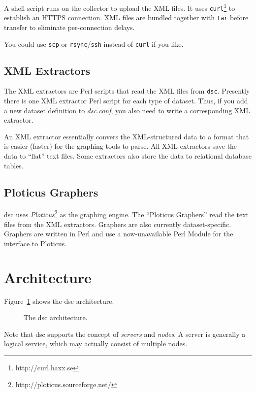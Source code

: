 \documentclass{report}
\def\dsc{{\sc dsc}}
\begin{document}
A shell script runs on the collector to upload the XML files.  It
uses {\tt curl\/}\footnote{http://curl.haxx.se} to establish an
HTTPS connection.  XML files are bundled together with {\tt tar\/}
before transfer to eliminate per-connection delays.

You could use {\tt scp\/} or {\tt rsync\/}/{\tt ssh\/} instead of
{\tt curl\/} if you like.

\subsection{XML Extractors}

The XML extractors are Perl scripts that read the XML files from
{\tt dsc\/}.  Presently there is one XML extractor Perl script for
each type of dataset.  Thus, if you add a new dataset definition
to {\em dsc.conf\/}, you also need to write a corresponding XML
extractor.

An XML extractor essentially convers the XML-structured data to a
format that is easier (faster) for the graphing tools to parse.
All XML extractors save the data to ``flat'' text files.  Some
extractors also store the data to relational database tables.

\subsection{Ploticus Graphers}

{\dsc} uses {\em Ploticus\/}\footnote{http://ploticus.sourceforge.net/}
as the graphing engine.  The ``Ploticus Graphers'' read the text
files from the XML extractors.  Graphers are also currently
dataset-specific.   Graphers are written in Perl and use a
now-unavailable Perl Module for the interface to Ploticus.


\section{Architecture}

Figure~\ref{fig-architecture} shows the {\dsc} architecture.  

\begin{figure}
\centerline{}
\label{fig-architecture}
\caption{The {\dsc} architecture.}
\end{figure}

Note that {\dsc} supports the concept of {\em servers\/} and {\em
nodes\/}.  A server is generally a logical service, which may
actually consist of multiple nodes.
\end{document}
